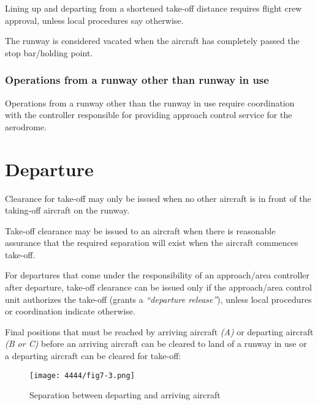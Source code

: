 Lining up and departing from a shortened take-off distance requires flight crew approval, unless local procedures say otherwise.

The runway is considered vacated when the aircraft has completely passed the stop bar/holding point.

\subsubsection{Operations from a runway other than runway in use}

Operations from a runway other than the runway in use require coordination with the controller responsible for providing approach control service for the aerodrome.

\section{Departure}
\label{sec:twr:dep}

Clearance for take-off may only be issued when no other aircraft is in front of the taking-off aircraft on the runway.

Take-off clearance may be issued to an aircraft when there is reasonable assurance that the required separation  will exist when the aircraft commences take-off.

For departures that come under the responsibility of an approach/area controller after departure, take-off clearance can be issued only if the approach/area control unit authorizes the take-off (grants a \emph{``departure release''}), unless local procedures or coordination indicate otherwise.

Final positions that must be reached by arriving aircraft \emph{(A)} or departing aircraft \emph{(B or C)} before an arriving aircraft can be cleared to land of a runway in use or a departing aircraft can be cleared for take-off:

\begin{figure}[htbp]
    \centering
    \texttt{[image: 4444/fig7-3.png]}
    \caption{Separation between departing and arriving aircraft~\cite{4444}}
    \label{fig:separation_between_dep_and_arr}
\end{figure}

